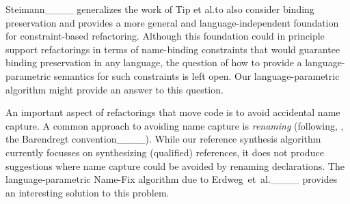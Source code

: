 Steimann____ generalizes the work of Tip et al.\@ to also consider binding preservation and provides a more general and language-independent foundation for constraint-based refactoring.
Although this foundation could in principle support refactorings in terms of name-binding constraints that would guarantee binding preservation in any language, the question of how to provide a language-parametric semantics for such constraints is left open.
Our language-parametric algorithm might provide an answer to this question.

An important aspect of refactorings that move code is to avoid accidental name capture.
A common approach to avoiding name capture is \emph{renaming} (following, \eg, the Barendregt convention____).
While our reference synthesis algorithm currently focusses on synthesizing (qualified) references, it does not produce suggestions where name capture could be avoided by renaming declarations.
The language-parametric Name-Fix algorithm due to Erdweg~et~al.____ provides an interesting solution to this problem.



